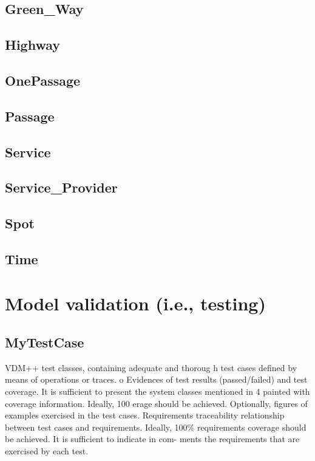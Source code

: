 \documentclass[a4paper]{article}
\begin{document}
\subsection{Green\_Way}

\subsection{Highway}

\subsection{OnePassage}

\subsection{Passage}

\subsection{Service}

\subsection{Service\_Provider}

\subsection{Spot}

\subsection{Time}

\section{Model validation (i.e., testing)}
\subsection{MyTestCase}

VDM++ test classes, containing adequate and thoroug
h test cases defined by means of 
operations or traces.  
o
Evidences of test results (passed/failed) and test 
coverage. It is sufficient to present the 
system classes mentioned in 4 painted with coverage
 information. Ideally, 100%
erage should be achieved. 
Optionally, figures of examples exercised in the test cases. 
Requirements  traceability  relationship  between  test  cases  and requirements.  Ideally, 100\%  requirements  coverage  should  be  achieved.  It  is  sufficient  to  indicate  in  com-
ments the requirements that are exercised by each test. 
\end{document}

